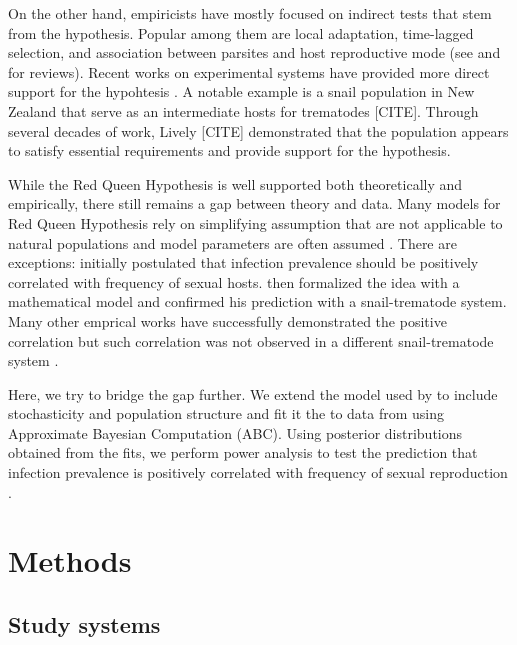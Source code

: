 \documentclass{article}\usepackage[]{graphicx}\usepackage[]{color}
\begin{document}
On the other hand, empiricists have mostly focused on indirect tests that stem from the hypothesis.
Popular among them are local adaptation, time-lagged selection, and association between parsites and host reproductive mode (see \cite{tobler2008expanding} and \cite{vergara2014infection} for reviews).
Recent works on experimental systems have provided more direct support for the hypohtesis \citep{auld2016sex, slowinski2016coevolutionary}.
A notable example is a snail population in New Zealand that serve as an intermediate hosts for trematodes [CITE].
Through several decades of work, Lively [CITE] demonstrated that the population appears to satisfy essential requirements and provide support for the hypothesis.

While the Red Queen Hypothesis is well supported both theoretically and empirically, there still remains a gap between theory and data.
Many models for Red Queen Hypothesis rely on simplifying assumption that are not applicable to natural populations and model parameters are often assumed \cite{ashby2015diversity}.
There are exceptions:
\cite{lively1992parthenogenesis} initially postulated that infection prevalence should be positively correlated with frequency of sexual hosts. 
\citep{lively2001trematode} then formalized the idea with a mathematical model and confirmed his prediction with a snail-trematode system.
Many other emprical works have successfully demonstrated the positive correlation \citep{lively2002temporal, kumpulainen2004parasites, vergara2013geographic, mckone2016fine} but such correlation was not observed in a different snail-trematode system \citep{dagan2013clonal}.

Here, we try to bridge the gap further.
We extend the model used by \cite{lively2010epidemiological} to include stochasticity and population structure and fit it the to data from \cite{dagan2013clonal, mckone2016fine, vergara2014infection} using Approximate Bayesian Computation (ABC).
Using posterior distributions obtained from the fits, we perform power analysis to test the prediction that infection prevalence is positively correlated with frequency of sexual reproduction \cite{lively2001trematode}.

\section{Methods}

\subsection{Study systems}
\end{document}
